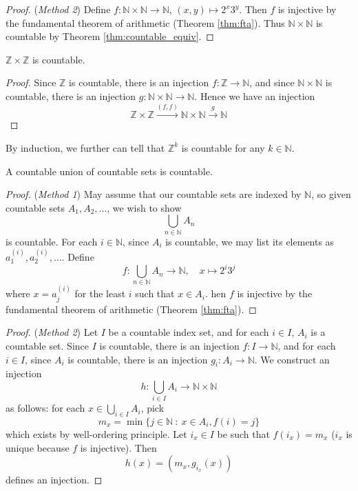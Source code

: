 \documentclass[10pt, a4paper, twoside]{report}
\begin{document}
\begin{proof}
    (\emph{Method 2}) Define \(f:\mathbb{N}\times\mathbb{N}\to\mathbb{N}\), \((x,y)\mapsto 2^x3^y\). Then \(f\) is injective by the fundamental theorem of arithmetic (Theorem \ref{thm:fta}). Thus \(\mathbb{N}\times\mathbb{N}\) is countable by Theorem \ref{thm:countable_equiv}.
\end{proof}
\begin{corollary}
    \(\mathbb{Z}\times\mathbb{Z}\) is countable.
\end{corollary}
\begin{proof}
    Since \(\mathbb{Z}\) is countable, there is an injection \(f:\mathbb{Z}\to\mathbb{N}\), and since \(\mathbb{N}\times\mathbb{N}\) is countable, there is an injection \(g:\mathbb{N}\times\mathbb{N}\to\mathbb{N}\). Hence we have an injection 
    \[\mathbb{Z}\times\mathbb{Z}\xrightarrow{(f,f)}\mathbb{N}\times\mathbb{N}\xrightarrow{g}\mathbb{N}\] 
\end{proof}
By induction, we further can tell that \(\mathbb{Z}^k\) is countable for any \(k\in\mathbb{N}\).
\begin{theorem}
    A countable union of countable sets is countable.
    \label{thm:union_countable}
\end{theorem}
\begin{proof}
    (\emph{Method 1}) May assume that our countable sets are indexed by \(\mathbb{N}\), so given countable sets \(A_1,A_2,\ldots\), we wish to show 
    \[\bigcup_{n\in\mathbb{N}}A_n\]
    is countable. For each \(i\in\mathbb{N}\), since \(A_i\) is countable, we may list its elements as \(a_1^{(i)},a_2^{(i)},\ldots\). Define
    \[f:\bigcup_{n\in\mathbb{N}}A_n\to\mathbb{N},\quad x\mapsto 2^i3^j\]
    where \(x=a_j^{(i)}\) for the least \(i\) such that \(x\in A_i\). hen \(f\) is injective by the fundamental theorem of arithmetic (Theorem \ref{thm:fta}).
\end{proof}
\begin{proof}
    (\emph{Method 2}) Let \(I\) be a countable index set, and for each \(i\in I\), \(A_i\) is a countable set. Since \(I\) is countable, there is an injection \(f:I\to\mathbb{N}\), and for each \(i\in I\), since \(A_i\) is countable, there is an injection \(g_i:A_i\to\mathbb{N}\). We construct an injection 
    \[h:\bigcup_{i\in{I}}A_i\to\mathbb{N}\times\mathbb{N}\]
    as follows: for each \(x\in\bigcup_{i\in{I}}A_i\), pick 
    \[m_x=\min\{j\in\mathbb{N}\::\:x\in A_i,f(i)=j\}\]
    which exists by well-ordering principle. Let \(i_x\in I\) be such that \(f(i_x)=m_x\) (\(i_x\) is unique because \(f\) is injective). Then 
    \[h(x)=(m_x,g_{i_x}(x))\]
    defines an injection.
\end{proof}
\end{document}
